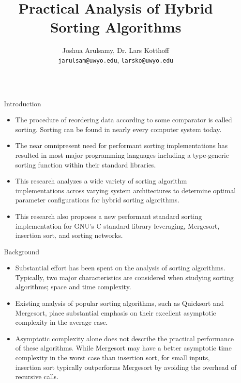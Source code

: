 \documentclass[final]{beamer}
\title{\Large Practical Analysis of Hybrid Sorting Algorithms}
\author{\large Joshua Arulsamy, Dr. Lars Kotthoff\\
	\normalsize \texttt{jarulsam@uwyo.edu}, \texttt{larsko@uwyo.edu}
}
\institute{Department of Electrical Engineering and Computer Science, University of Wyoming}
\newlength{\sepwidth}
\newlength{\colwidth}
\newcommand{\separatorcolumn}{\begin{column}{\sepwidth}\end{column}}
\begin{document}

\begin{frame}[t]
	\begin{columns}[t]
		\separatorcolumn

		\begin{column}{\colwidth}

			\begin{block}{Introduction}
				\begin{itemize}
					\item The procedure of reordering data according to some comparator is
					      called sorting. Sorting can be found in nearly every computer
					      system today.
					\item The near omnipresent need for performant sorting implementations
					      has resulted in most major programming languages including a
					      type-generic sorting function within their standard libraries.
					\item This research analyzes a wide variety of sorting algorithm
					      implementations across varying system architectures to determine
					      optimal parameter configurations for hybrid sorting algorithms.
					\item This research also proposes a new performant standard sorting
					      implementation for GNU's C standard library leveraging,
					      Mergesort, insertion sort, and sorting networks.
				\end{itemize}
			\end{block}

			\begin{block}{Background}
				\begin{itemize}
					\item Substantial effort has been spent on the analysis of sorting
					      algorithms. Typically, two major characteristics are considered
					      when studying sorting algorithms; space and time
					      complexity\parencite{Bentley1993EngineeringAS}.
					\item Existing analysis of popular sorting algorithms, such as
					      Quicksort and Mergesort, place substantial emphasis on their
					      excellent asymptotic complexity in the average
					      case\parencite{glibc}.
					\item Asymptotic complexity alone does not describe the practical
					      performance of these algorithms. While Mergesort may have a
					      better asymptotic time complexity in the worst case than
					      insertion sort, for small inputs, insertion sort typically
					      outperforms Mergesort by avoiding the overhead of recursive
					      calls.
				\end{itemize}
			\end{block}


\end{column}
\end{columns}
\end{frame}
\end{document}
